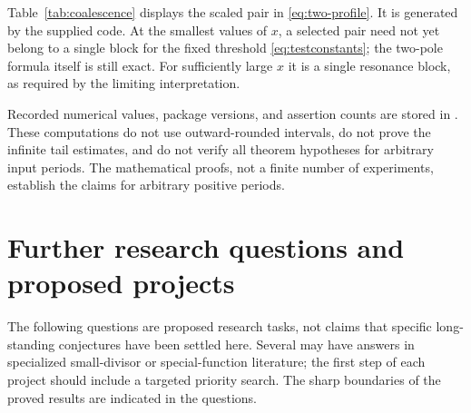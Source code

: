 \documentclass[11pt,a4paper]{article}
\numberwithin{equation}{section}
\theoremstyle{definition}
\theoremstyle{remark}
\begin{document}
Table~\ref{tab:coalescence} displays the scaled pair in
\eqref{eq:two-profile}. It is generated by the supplied code. At the
smallest values of $x$, a selected pair need not yet belong to a single
block for the fixed threshold \eqref{eq:testconstants}; the two-pole
formula itself is still exact. For sufficiently large $x$ it is a single
resonance block, as required by the limiting interpretation.
\begin{table}[htbp]
\centering\small

\caption{Scaled first-pair contribution for $\alpha=1+\lambda/x$ and its
uniform coalescence limit.}\label{tab:coalescence}
\end{table}

Recorded numerical values, package versions, and assertion counts are
stored in . These computations do not use
outward-rounded intervals, do not prove the infinite tail estimates, and
do not verify all theorem hypotheses for arbitrary input periods. The
mathematical proofs, not a finite number of experiments, establish the
claims for arbitrary positive periods.

\section{Further research questions and proposed projects}
\label{sec:questions}
The following questions are proposed research tasks, not claims that
specific long-standing conjectures have been settled here. Several may
have answers in specialized small-divisor or special-function literature;
the first step of each project should include a targeted priority search.
The sharp boundaries of the proved results are indicated in the questions.
\end{document}
